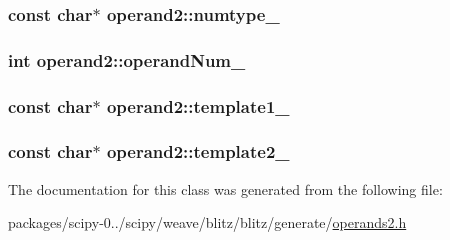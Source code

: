 \subsubsection[{numtype\+\_\+}]{\setlength{\rightskip}{0pt plus 5cm}const char$\ast$ operand2\+::numtype\+\_\+\hspace{0.3cm}{\ttfamily [protected]}}\label{classoperand2_a1e7907939a95e6552b34f4fb2a9e276a}
\hypertarget{classoperand2_abcd8e1dffce72e71f3aa655986964c23}{}
\subsubsection[{operand\+Num\+\_\+}]{\setlength{\rightskip}{0pt plus 5cm}int operand2\+::operand\+Num\+\_\+\hspace{0.3cm}{\ttfamily [protected]}}\label{classoperand2_abcd8e1dffce72e71f3aa655986964c23}
\hypertarget{classoperand2_add8067156ebe511710be8e3b0d5762b1}{}
\subsubsection[{template1\+\_\+}]{\setlength{\rightskip}{0pt plus 5cm}const char$\ast$ operand2\+::template1\+\_\+\hspace{0.3cm}{\ttfamily [protected]}}\label{classoperand2_add8067156ebe511710be8e3b0d5762b1}
\hypertarget{classoperand2_a831f3692d46e7ceb931ebb5e301c7c48}{}
\subsubsection[{template2\+\_\+}]{\setlength{\rightskip}{0pt plus 5cm}const char$\ast$ operand2\+::template2\+\_\+\hspace{0.3cm}{\ttfamily [protected]}}\label{classoperand2_a831f3692d46e7ceb931ebb5e301c7c48}


The documentation for this class was generated from the following file\+:\begin{DoxyCompactItemize}
\item 
packages/scipy-\/0../scipy/weave/blitz/blitz/generate/\hyperlink{operands2_8h}{operands2.\+h}\end{DoxyCompactItemize}
